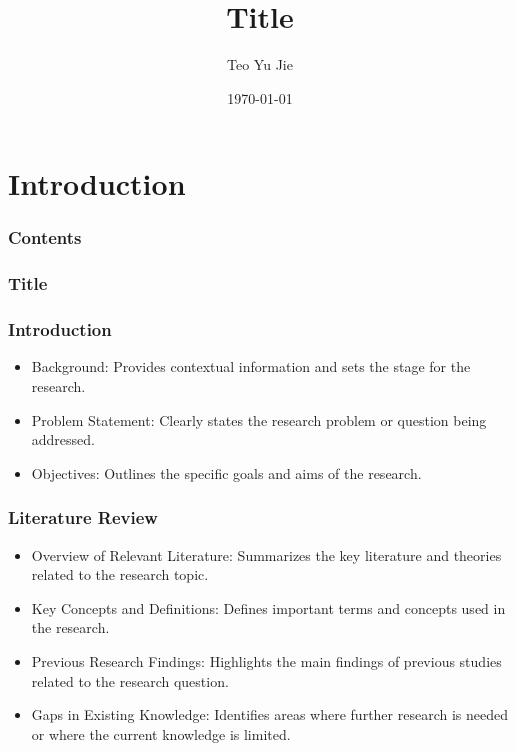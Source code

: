 \documentclass[%
  beameroptions={ignorenonframetext,11pt,169},
  articleoptions={11pt},
  also={trans,handout,article},
  ]{beamerswitch}
\title[Subtitle]{Title}
\author[]{Teo Yu Jie}
\institute[Institute]{School}
\date{\today}
\begin{document}
\maketitle

\section{Introduction}

\frame{\titlepage}

\begin{frame}
    \setcounter{footnote}{0}
    \frametitle{Contents}
    \tableofcontents
\end{frame}


\begin{frame}[plain]
    \frametitle{Title}
    \setcounter{footnote}{0}
    \setcounter{equation}{0}
\end{frame}

\begin{frame}
  \frametitle{Introduction}
  \setcounter{footnote}{0}
  \setcounter{equation}{0}
  \begin{itemize}
    \item Background: Provides contextual information and sets the stage for the research.
    \item Problem Statement: Clearly states the research problem or question being addressed.
    \item Objectives: Outlines the specific goals and aims of the research.
  \end{itemize}
\end{frame}

\begin{frame}
  \frametitle{Literature Review}
  \setcounter{footnote}{0}
  \setcounter{equation}{0}
  \begin{itemize}
    \item Overview of Relevant Literature: Summarizes the key literature and theories related to the research topic.
    \item Key Concepts and Definitions: Defines important terms and concepts used in the research.
    \item Previous Research Findings: Highlights the main findings of previous studies related to the research question.
    \item Gaps in Existing Knowledge: Identifies areas where further research is needed or where the current knowledge is limited.
  \end{itemize}
\end{frame}
\end{document}
